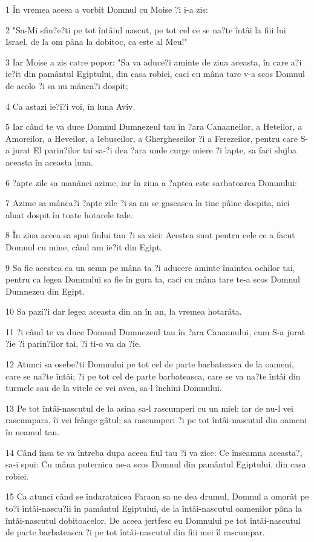 \par 1 În vremea aceea a vorbit Domnul cu Moise ?i i-a zis:
\par 2 "Sa-Mi sfin?e?ti pe tot întâiul nascut, pe tot cel ce se na?te întâi la fiii lui Israel, de la om pâna la dobitoc, ca este al Meu!"
\par 3 Iar Moise a zis catre popor: "Sa va aduce?i aminte de ziua aceasta, în care a?i ie?it din pamântul Egiptului, din casa robiei, caci cu mâna tare v-a scos Domnul de acolo ?i sa nu mânca?i dospit;
\par 4 Ca astazi ie?i?i voi, în luna Aviv.
\par 5 Iar când te va duce Domnul Dumnezeul tau în ?ara Canaaneilor, a Heteilor, a Amoreilor, a Heveilor, a Iebuseilor, a Ghergheseilor ?i a Ferezeilor, pentru care S-a jurat El parin?ilor tai sa-?i dea ?ara unde curge miere ?i lapte, sa faci slujba aceasta în aceasta luna.
\par 6 ?apte zile sa manânci azime, iar în ziua a ?aptea este sarbatoarea Domnului:
\par 7 Azime sa mânca?i ?apte zile ?i sa nu se gaseasca la tine pâine dospita, nici aluat dospit în toate hotarele tale.
\par 8 În ziua aceea sa spui fiului tau ?i sa zici: Acestea sunt pentru cele ce a facut Domnul cu mine, când am ie?it din Egipt.
\par 9 Sa fie acestea ca un semn pe mâna ta ?i aducere aminte înaintea ochilor tai, pentru ca legea Domnului sa fie în gura ta, caci cu mâna tare te-a scos Domnul Dumnezeu din Egipt.
\par 10 Sa pazi?i dar legea aceasta din an în an, la vremea hotarâta.
\par 11 ?i când te va duce Domnul Dumnezeul tau în ?ara Canaanului, cum S-a jurat ?ie ?i parin?ilor tai, ?i ti-o va da ?ie,
\par 12 Atunci sa osebe?ti Domnului pe tot cel de parte barbateasca de la oameni, care se na?te întâi; ?i pe tot cel de parte barbateasca, care se va na?te întâi din turmele sau de la vitele ce vei avea, sa-l închini Domnului.
\par 13 Pe tot întâi-nascutul de la asina sa-l rascumperi cu un miel; iar de nu-l vei rascumpara, îi vei frânge gâtul; sa rascumperi ?i pe tot întâi-nascutul din oameni în neamul tau.
\par 14 Când însa te va întreba dupa aceea fiul tau ?i va zice: Ce înseamna aceasta?, sa-i spui: Cu mâna puternica ne-a scos Domnul din pamântul Egiptului, din casa robiei.
\par 15 Ca atunci când se îndaratnicea Faraon sa ne dea drumul, Domnul a omorât pe to?i întâi-nascu?ii în pamântul Egiptului, de la întâi-nascutul oamenilor pâna la întâi-nascutul dobitoacelor. De aceea jertfesc eu Domnului pe tot întâi-nascutul de parte barbateasca ?i pe tot întâi-nascutul din fiii mei îl rascumpar.
